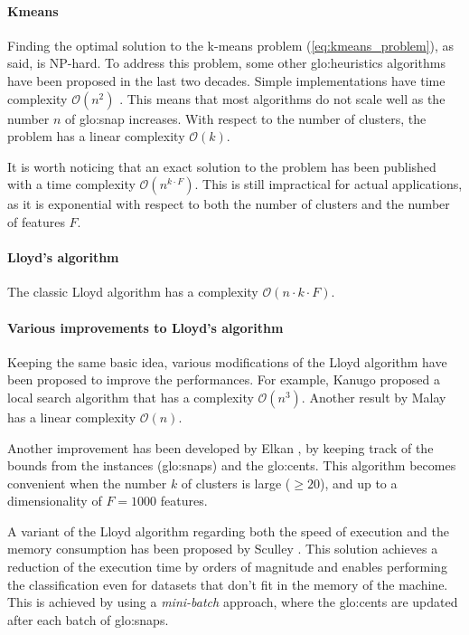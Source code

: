 \paragraph*{Kmeans}
Finding the optimal solution to the k-means problem (\autoref{eq:kmeans_problem}), as said, is NP-hard.
To address this problem, some other {\gls{glo:heuristic}}s algorithms have been proposed in the last two decades. Simple implementations have time complexity $\mathcal{O}(n^2)$ \cite{Kmeans_linear}.  This means that most algorithms do not scale well as the number $n$ of {\gls{glo:snap}} increases. With respect to the number of clusters, the problem has a linear complexity $\mathcal{O}(k)$.

It is worth noticing that an exact solution to the problem has been published \cite{Kmeans_vornoi_japan} with a time complexity $\mathcal{O}(n^{k\cdot F})$. This is still impractical for actual applications, as it is exponential with respect to both the number of clusters and the number of features $F$.

\paragraph*{Lloyd's algorithm}
The classic Lloyd algorithm \cite{Lloyd1982} has a complexity $\mathcal{O}(n\cdot k\cdot F )$.

\paragraph*{Various improvements to Lloyd's algorithm} Keeping the same basic idea, various modifications of the Lloyd algorithm have been proposed to improve the performances. For example, Kanugo \cite{kanungo2004local} proposed a local search algorithm that has a complexity $\mathcal{O}(n^3)$. Another result by Malay \cite{Kmeans_linear} has a linear complexity $\mathcal{O}(n)$. 

Another improvement has been developed by Elkan \cite{kmeans-accelerated}, by keeping track of the bounds from the instances ({\gls{glo:snap}}s) and the {\gls{glo:cent}}s. This algorithm becomes convenient when the number $k$ of clusters is large ($\geq 20$), and up to a dimensionality of $F=1000$ features.

A variant of the Lloyd algorithm regarding both the speed of execution and the memory consumption has been proposed by Sculley \cite{Sculley2010}. This solution achieves a reduction of the execution time by orders of magnitude and enables performing the classification even for datasets that don't fit in the memory of the machine. This is achieved by using a \emph{mini-batch} approach, where the {\gls{glo:cent}}s are updated after each batch of {\gls{glo:snap}}s.

